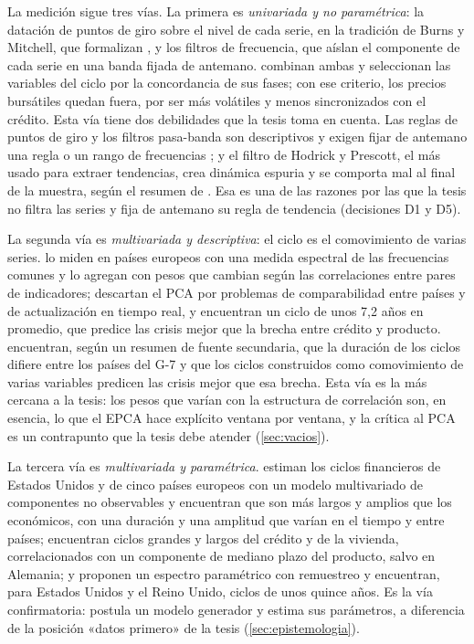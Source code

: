 La medición sigue tres vías. La primera es \emph{univariada y no paramétrica}: la datación de
puntos de giro sobre el nivel de cada serie, en la tradición de Burns y Mitchell, que formalizan
\textcite{harding_pagan_2002}, y los filtros de frecuencia, que aíslan el componente de cada serie
en una banda fijada de antemano. \textcite{drehmann_borio_tsatsaronis_2012} combinan ambas y
seleccionan las variables del ciclo por la concordancia de sus fases; con ese criterio, los
precios bursátiles quedan fuera, por ser más volátiles y menos sincronizados con el crédito. Esta
vía tiene dos debilidades que la tesis toma en cuenta. Las reglas de puntos de giro y los filtros
pasa-banda son descriptivos y exigen fijar de antemano una regla o un rango de frecuencias
\parencite{strohsal_proano_wolters_2019}; y el filtro de Hodrick y Prescott, el más usado para
extraer tendencias, crea dinámica espuria y se comporta mal al final de la muestra, según el
resumen de \textcite{hamilton_2018}. Esa es una de las razones por las que la tesis no filtra las
series y fija de antemano su regla de tendencia (decisiones D1 y D5).

La segunda vía es \emph{multivariada y descriptiva}: el ciclo es el comovimiento de varias series.
\textcite{schuler_hiebert_peltonen_2015} lo miden en países europeos con una medida espectral de
las frecuencias comunes y lo agregan con pesos que cambian según las correlaciones entre pares de
indicadores; descartan el PCA por problemas de comparabilidad entre países y de actualización en
tiempo real, y encuentran un ciclo de unos 7,2 años en promedio, que predice las crisis mejor que la
brecha entre crédito y producto. \textcite{schuler_hiebert_peltonen_2020} encuentran, según un
resumen de fuente secundaria, que la duración de los ciclos difiere entre los países del G-7 y
que los ciclos construidos como comovimiento de varias variables predicen las crisis mejor que esa
brecha. Esta vía es la más cercana a la tesis: los pesos que varían con la estructura de
correlación son, en esencia, lo que el EPCA hace explícito ventana por ventana, y la crítica al
PCA es un contrapunto que la tesis debe atender (\cref{sec:vacios}).

La tercera vía es \emph{multivariada y paramétrica}. \textcite{galati_et_al_2016} estiman los
ciclos financieros de Estados Unidos y de cinco países europeos con un modelo multivariado de
componentes no observables y encuentran que son más largos y amplios que los económicos, con una
duración y una amplitud que varían en el tiempo y entre países; \textcite{runstler_vlekke_2018}
encuentran ciclos grandes y largos del crédito y de la vivienda, correlacionados con un componente
de mediano plazo del producto, salvo en Alemania; y \textcite{strohsal_proano_wolters_2019}
proponen un espectro paramétrico con remuestreo y encuentran, para Estados Unidos y el Reino
Unido, ciclos de unos quince años. Es la vía confirmatoria: postula un modelo generador y estima
sus parámetros, a diferencia de la posición «datos primero» de la tesis
(\cref{sec:epistemologia}).

